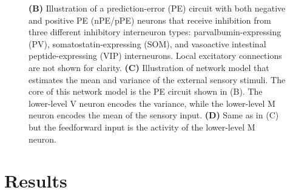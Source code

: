 \documentclass[10pt,a4paper]{article}
\begin{document}
\begin{figure}[t!]
{{\bf (B)} Illustration of a prediction-error (PE) circuit with both negative and positive PE (nPE/pPE) neurons that receive inhibition from three different inhibitory interneuron types: parvalbumin-expressing (PV), somatostatin-expressing (SOM), and vasoactive intestinal peptide-expressing (VIP) interneurons. Local excitatory connections are not shown for clarity.
{\bf (C)} Illustration of network model that estimates the mean and variance of the external sensory stimuli. The core of this network model is the PE circuit shown in (B). The lower-level V neuron encodes the variance, while the lower-level M neuron encodes the mean of the sensory input.
{\bf (D)} Same as in (C) but the feedforward input is the activity of the lower-level M neuron.
}
\label{fig:Fig_1}
\end{figure}
%


\section*{Results}
%
\end{document}
